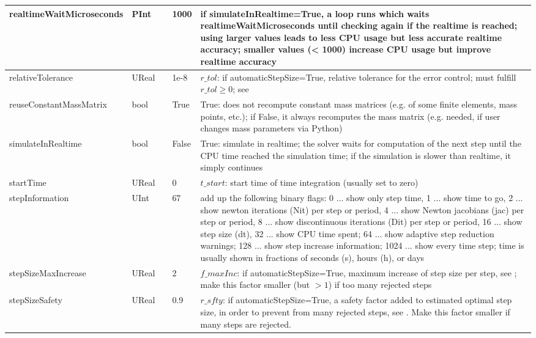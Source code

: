\begin{center}
\begin{longtable}{| p{4.2cm} | p{2.5cm} | p{0.3cm} | p{3.0cm} | p{6cm} |}
    realtimeWaitMicroseconds &     PInt &      &     1000 &     if simulateInRealtime=True, a loop runs which waits realtimeWaitMicroseconds until checking again if the realtime is reached; using larger values leads to less CPU usage but less accurate realtime accuracy; smaller values (< 1000) increase CPU usage but improve realtime accuracy\\ \hline
    relativeTolerance &     UReal &      &     1e-8 &     $r\_{tol}$: if automaticStepSize=True, relative tolerance for the error control; must fulfill $r\_{tol} \ge 0$; see {sec:ExplicitSolver}\\ \hline
    reuseConstantMassMatrix &     bool &      &     True &     True: does not recompute constant mass matrices (e.g. of some finite elements, mass points, etc.); if False, it always recomputes the mass matrix (e.g. needed, if user changes mass parameters via Python)\\ \hline
    simulateInRealtime &     bool &      &     False &     True: simulate in realtime; the solver waits for computation of the next step until the CPU time reached the simulation time; if the simulation is slower than realtime, it simply continues\\ \hline
    startTime &     UReal &      &     0 &     $t\_{start}$: start time of time integration (usually set to zero)\\ \hline
    stepInformation &     UInt &      &     67 &     add up the following binary flags: 0 ... show only step time, 1 ... show time to go, 2 ... show newton iterations (Nit) per step or period, 4 ... show Newton jacobians (jac) per step or period, 8 ... show discontinuous iterations (Dit) per step or period, 16 ... show step size (dt), 32 ... show CPU time spent; 64 ... show adaptive step reduction warnings; 128 ... show step increase information; 1024 ... show every time step; time is usually shown in fractions of seconds (s), hours (h), or days\\ \hline
    stepSizeMaxIncrease &     UReal &      &     2 &     $f\_{maxInc}$: if automaticStepSize=True, maximum increase of step size per step, see {sec:ExplicitSolver}; make this factor smaller (but $> 1$) if too many rejected steps\\ \hline
    stepSizeSafety &     UReal &      &     0.9 &     $r\_{sfty}$: if automaticStepSize=True, a safety factor added to estimated optimal step size, in order to prevent from many rejected steps, see {sec:ExplicitSolver}. Make this factor smaller if many steps are rejected.\\ \hline

\end{longtable}
\end{center}

